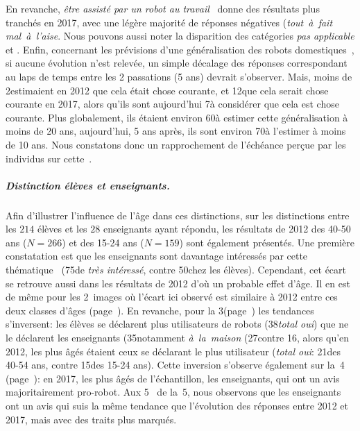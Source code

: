             En revanche, \textit{être assisté par un robot au travail}~ donne des résultats plus tranchés en 2017, avec une légère majorité de réponses négatives (\ie \textit{tout~à~fait mal~à~l'aise}. 
            Nous pouvons aussi noter la disparition des catégories \textit{pas applicable} et .
            Enfin, concernant les prévisions d'une généralisation des robots domestiques~, si aucune évolution n'est relevée, un simple décalage des réponses correspondant au laps de temps entre les 2 passations (5 ans) devrait s'observer.
            Mais, moins de 2\prc estimaient en 2012 que cela était chose courante, et 12\prc que cela serait chose courante en 2017, alors qu'ils sont aujourd'hui 7\prc à considérer que cela est chose courante. Plus globalement, ils étaient environ 60\prc à estimer cette généralisation à moins de 20 ans, aujourd'hui, 5 ans après, ils sont environ 70\prc à l'estimer à moins de 10 ans. Nous constatons donc un rapprochement de l'échéance perçue par les individus sur cette~.
          \subparagraph{Distinction élèves et enseignants.}
            Afin d'illustrer l'influence de l'âge dans ces distinctions, sur  les distinctions entre les $214$ élèves et les $28$ enseignants ayant répondu, les résultats de 2012 des 40-50 ans ($N=266$) et des 15-24 ans ($N=159$) sont également présentés.
            Une première constatation est que les enseignants sont davantage intéressés par cette thématique~ (75\prc de \textit{très intéressé}, contre 50\prc chez les élèves). Cependant, cet écart se retrouve aussi dans les résultats de 2012 d'où un probable effet d'âge. 
            Il en est de même pour les 2~images où l'écart ici observé est similaire à 2012 entre ces deux classes d'âges ({\footnotesize page~\pageref{QA2-1}}).
            En revanche, pour la 3\ieme {}({\footnotesize page~\pageref{QA3}}) les tendances s'inversent: les élèves se déclarent plus utilisateurs de robots (38\prc \textit{total oui}) que ne le déclarent les enseignants (35\prc[)] notamment \textit{à~la~maison} (27\prc contre 16\prc[)], alors qu'en 2012, les plus âgés étaient ceux se déclarant le plus utilisateur (\textit{total oui}: 21\prc des 40-54 ans, contre 15\prc des 15-24 ans).
            Cette inversion s'observe également sur la~4 ({\footnotesize page~\pageref{QA4}}): en 2017, les plus âgés de l'échantillon, les enseignants, qui ont un avis majoritairement pro-robot.
            Aux 5~ de la~5, nous observons que les enseignants ont un avis qui suis la même tendance que l'évolution des réponses entre 2012 et 2017, mais avec des traits plus marqués. 
